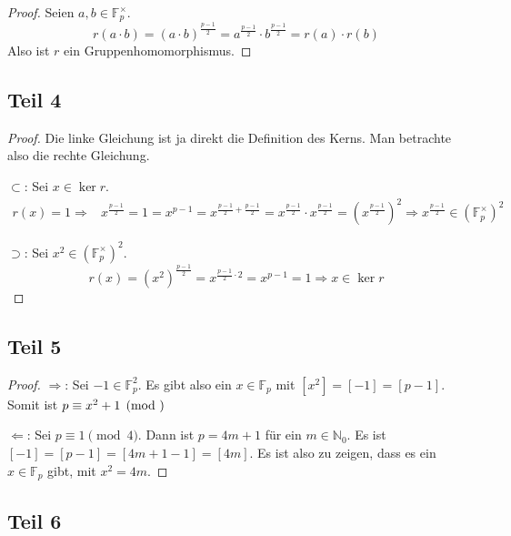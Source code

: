 \documentclass[10pt,a4paper]{article}
\begin{document}
\begin{proof}


  Seien $a, b \in \mathbb{F}_{p}^{\times}$.
  \begin{equation}
    r(a \cdot b) = (a \cdot b)^{\frac{p - 1}{2}} = a^{\frac{p - 1}{2}} \cdot b^{\frac{p - 1}{2}} = r(a) \cdot r(b)
  \end{equation}
  Also ist $r$ ein Gruppenhomomorphismus.
\end{proof}

\subsection{Teil 4}

\begin{proof}
  Die linke Gleichung ist ja direkt die Definition des Kerns.
  Man betrachte also die rechte Gleichung.

  $\subset$: Sei $x \in \ker r$.
  \begin{align*}
    r(x) = 1 \Rightarrow & x^{\frac{p - 1}{2}} = 1 = x^{p - 1} = x^{\frac{p - 1}{2} + \frac{p - 1}{2}} = x^{\frac{p - 1}{2}} \cdot x^{\frac{p - 1}{2}} = (x^{\frac{p - 1}{2}})^{2} \Rightarrow x^{\frac{p - 1}{2}} \in (\mathbb{F}_{p}^{\times})^{2}
  \end{align*}

  $\supset$: Sei $x^{2} \in (\mathbb{F}_{p}^{\times})^{2}$.
  \begin{equation}
    r(x) = (x^{2})^{\frac{p - 1}{2}} = x^{\frac{p - 1}{2} \cdot 2} = x^{p - 1} = 1 \Rightarrow x \in \ker r
  \end{equation}
\end{proof}

\subsection{Teil 5}

\begin{proof}
  $\Rightarrow$: Sei $-1 \in \mathbb{F}_{p}^{2}$.
  Es gibt also ein $x \in \mathbb{F}_{p}$ mit $[x^{2}] = [-1] = [p - 1]$.
  Somit ist $p \equiv x^{2} + 1 \pmod $

  $\Leftarrow$: Sei $p \equiv 1 \pmod 4$.
  Dann ist $p = 4m + 1$ für ein $m \in \mathbb{N}_{0}$.
  Es ist $[-1] = [p - 1] = [4m + 1 - 1] = [4m]$.
  Es ist also zu zeigen, dass es ein $x \in \mathbb{F}_{p}$ gibt, mit $x^{2} = 4m$.
\end{proof}

\subsection{Teil 6}
\end{document}
